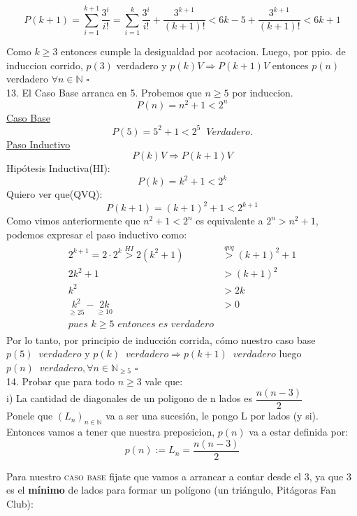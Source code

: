 \documentclass[a4paper,11pt]{article}
\begin{document}
\[ P(k+1) =  \sum\limits_{i=1}^{k+1} \frac{3^i}{i!} = \sum\limits_{i=1}^{k} \frac{3^i}{i!} + \frac{3^{k+1}}{(k+1)!} < 6k - 5 + \frac{3^{k+1}}{(k+1)!} < 6k+1 \]

Como $k \geq 3$ entonces cumple la desigualdad por acotacion. Luego, por ppio. de induccion corrido, $p(3)$ verdadero y $p(k) V \Rightarrow P(k+1)V$ entonces $p(n)$ verdadero $\forall n \in \mathbb{N}$
\hfill$\square$\\
13. El Caso Base arranca en 5. Probemos que $n \geq 5$ por induccion.
\[ P(n) =  n^2 + 1 < 2^n \]
\underline{Caso Base}\\
\[ P(5) = 5^2 + 1 < 2^5 \;\;\textit{Verdadero.} \] 
\underline{Paso Inductivo}\\
\[P(k) V \Rightarrow P(k+1) V\]
Hipótesis Inductiva(HI):\[ P(k) =  k^2 + 1 < 2^k \]
Quiero ver que(QVQ):\[ P(k+1) =  (k+1)^2 + 1 < 2^{k+1} \]
Como vimos anteriormente que $n^2 +1 < 2^n$ es equivalente a $2^n > n^2 +1$, podemos expresar el paso inductivo como:\\
\begin{align*}
\begin{split}
2^{k+1}=2 \cdot 2^k \overset{HI}{>} 2(k^2+1) & \overset{qvq}{>} (k+1)^2 +1\\
2k^2 + 1 & > (k+1)^2 \\
k^2 & > 2k \\
\underset{\geq 25}{k^2} - \underset{\geq 10}{2k} & > 0 \\
\textit{pues $k \geq 5$ entonces es verdadero}
\end{split}
\end{align*}
Por lo tanto, por principio de inducción corrida, cómo nuestro caso base $p(5)\;\;verdadero$  y $p(k) \;\;verdadero \Rightarrow p(k+1)\;\;verdadero$ luego $p(n)\;\;verdadero, \forall n \in \mathbb{N}_{\geq 5}$
\hfill$\square$\\
14. Probar que para todo $n \geq 3$ vale que:\\
i) La cantidad de diagonales de un poligono de n lados es $\dfrac{n(n-3)}{2}$\\

Ponele que $(L_n)_{n\in\mathbb{N}}$ va a ser una sucesión, le pongo L por lados (y si).  Entonces vamos a tener que nuestra preposicion, $p(n)$ va a estar definida por: \\
\[p(n) := L_n = \dfrac{n(n-3)}{2}\]

Para nuestro \textsc{caso base} fijate que vamos a arrancar a contar desde el 3, ya que 3 es el \textbf{mínimo} de lados para formar un polígono (un triángulo, Pitágoras Fan Club):
\end{document}
